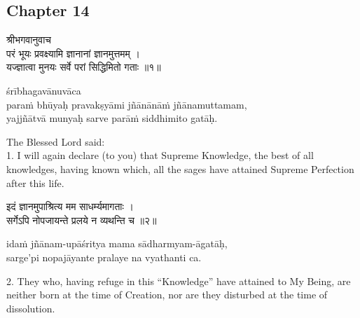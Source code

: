 \chapterdrop

\begin{center}

\headerspace
{}

\section{Chapter 14}

\headerspace
{}

\headerspace
{}

\headerspace
{}

\headerspace
\end{center}

\begin{gitaverse}
श्रीभगवानुवाच \\
परं भूयः प्रवक्ष्यामि ज्ञानानां ज्ञानमुत्तमम् । \\
यज्ज्ञात्वा मुनयः सर्वे परां सिद्धिमितो गताः ॥१॥
\end{gitaverse}

\begin{transliteration}
śrībhagavānuvāca \\
paraṁ bhūyaḥ pravakṣyāmi jñānānāṁ jñānamuttamam, \\
yajjñātvā munyaḥ sarve parāṁ siddhimito gatāḥ.
\end{transliteration}

The Blessed Lord said: \\
1. I will again declare (to you) that Supreme Knowledge, the best of all
knowledges, having known which, all the sages have attained Supreme Perfection
after this life.

\begin{gitaverse}
इदं ज्ञानमुपाश्रित्य मम साधर्म्यमागताः । \\
सर्गेऽपि नोपजायन्ते प्रलये न व्यथन्ति च ॥२॥
\end{gitaverse}

\begin{transliteration}
idaṁ jñānam-upāśritya mama sādharmyam-āgatāḥ, \\
sarge'pi nopajāyante pralaye na vyathanti ca.
\end{transliteration}

2. They who, having refuge in this ``Knowledge'' have attained to My Being, are
neither born at the time of Creation, nor are they disturbed at the time of
dissolution.

